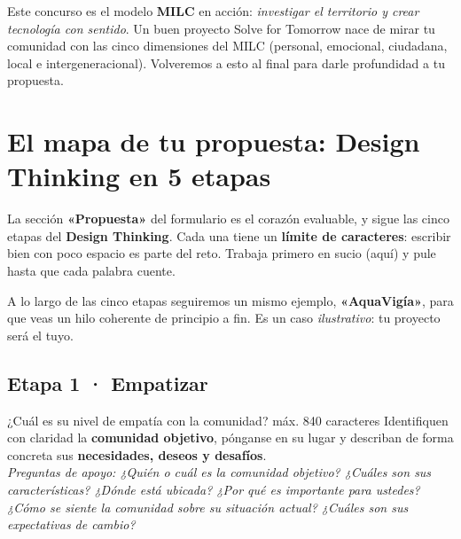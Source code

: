 \documentclass[11pt, letterpaper]{article}
\newcommand{\preg}[1]{\textit{\textcolor{smjVino}{#1}}}
\begin{document}
\begin{milcbox}
Este concurso es el modelo \textbf{MILC} en acción: \emph{investigar el territorio y crear tecnología con sentido}. Un buen proyecto Solve for Tomorrow nace de mirar tu comunidad con las cinco dimensiones del MILC (personal, emocional, ciudadana, local e intergeneracional). Volveremos a esto al final para darle profundidad a tu propuesta.
\end{milcbox}

\section{El mapa de tu propuesta: Design Thinking en 5 etapas}

La sección \textbf{«Propuesta»} del formulario es el corazón evaluable, y sigue las cinco etapas del \textbf{Design Thinking}. Cada una tiene un \textbf{límite de caracteres}: escribir bien con poco espacio es parte del reto. Trabaja primero en sucio (aquí) y pule hasta que cada palabra cuente.

A lo largo de las cinco etapas seguiremos un mismo ejemplo, \textbf{«AquaVigía»}, para que veas un hilo coherente de principio a fin. Es un caso \emph{ilustrativo}: tu proyecto será el tuyo.

\subsection{Etapa 1 · Empatizar}
\begin{pidebox}{¿Cuál es su nivel de empatía con la comunidad? \hfill\normalfont\small máx. 840 caracteres}
Identifiquen con claridad la \textbf{comunidad objetivo}, pónganse en su lugar y describan de forma concreta sus \textbf{necesidades, deseos y desafíos}.
\smallskip\\
\preg{Preguntas de apoyo: ¿Quién o cuál es la comunidad objetivo? ¿Cuáles son sus características? ¿Dónde está ubicada? ¿Por qué es importante para ustedes? ¿Cómo se siente la comunidad sobre su situación actual? ¿Cuáles son sus expectativas de cambio?}
\end{pidebox}
\end{document}
